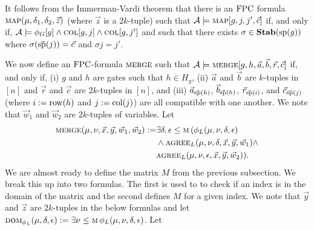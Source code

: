 \documentclass[../paper.tex]{subfiles}
\begin{document}
It follows from the Immerman-Vardi theorem that there is an $\text{\upshape FPC}$ formula
$\textsc{map}(\mu, \delta_1, \delta_2, \vec{z})$ (where $\vec{z}$ is a $2k$-tuple)
such that $\mathcal{A} \models \textsc{map}[g, j, j', \vec{c}]$ if, and only if,
$\mathcal{A} \models \phi_G [g] \land \textsc{col}[g, j] \land \textsc{col}[g, j']$ and
such that there exists $\sigma \in \text{\textbf{Stab}} (\text{sp} (g))$ where $\sigma (\vec{\text{sp}}(j)) =
\vec{c}$ and $\sigma j = j'$.
				
				
We now define an $\text{\upshape FPC}$-formula $\textsc{merge}$ such that $\mathcal{A} \models
\textsc{merge}[g, h, \vec{a}, \vec{b}, \vec{r}, \vec{c}]$ if, and only if, (i) $g$
and $h$ are gates such that $h \in H_g$, (ii) $\vec{a}$ and $\vec{b}$ are
$k$-tuples in $[n]$ and $\vec{r}$ and $\vec{c}$ are $2k$-tuples in $[n]$, and
(iii) $\vec{a}_{\vec{\text{sp}}(h)}$, $\vec{b}_{\vec{\text{sp}}(h)}$,
$\vec{r}_{\vec{\text{sp}}(i)}$, and $\vec{c}_{\vec{\text{sp}}(j)}$ (where $i := \text{row}
(h)$ and $j := \text{col} (j)$) are all compatible with one another. We note that
$\vec{w}_1$ and $\vec{w}_2$ are $2k$-tuples of variables. Let
\begin{align*}
	\textsc{merge} (\mu, \nu, \vec{x}, \vec{y}, \vec{w}_1, \vec{w}_2) := & \exists \delta, \epsilon \leq \textsc{m} \, ( \phi_L (\mu, \nu, \delta, \epsilon) \\ & \land \textsc{agree}_L (\mu, \nu , \delta, \vec{x}, \vec{y}, \vec{w}_1) \land \\ & \textsc{agree}_L (\mu, \nu , \epsilon, \vec{x}, \vec{y}, \vec{w}_2)).
\end{align*}
We are almost ready to define the matrix $M$ from the previous subsection. We
break this up into two formulas. The first is used to to check if an index is in
the domain of the matrix and the second defines $M$ for a given index. We note
that $\vec{y}$ and $\vec{z}$ are $2k$-tuples in the below formulas and let
$\textsc{dom}_{\phi_L} (\mu, \delta, \epsilon) := \exists \nu \leq \textsc{m} \, \phi_L
(\mu, \nu, \delta, \epsilon)$. Let
				
\end{document}

